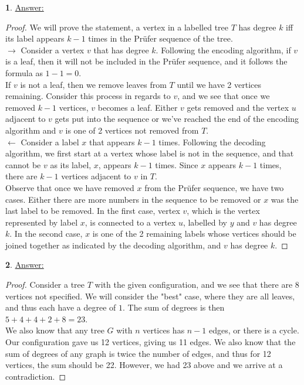 \documentclass[12pt,a4paper]{article}
\theoremstyle{definition}
\newtheorem{problem}{}
\begin{document}
\begin{problem} \underline{Answer:}
\begin{proof} 
We will prove the statement, a vertex in a labelled tree $T$ has degree $k$ iff its label appears $k - 1$ times in the Pr\"ufer sequence of the tree. \\

$\rightarrow$ Consider a vertex $v$ that has degree $k$. Following the encoding algorithm, if $v$ is a leaf, then it will not be included in the Pr\"ufer sequence, and it follows the formula as $1 - 1 = 0$. \\

If $v$ is not a leaf, then we remove leaves from $T$ until we have 2 vertices remaining. Consider this process in regards to $v$, and we see that once we removed $k - 1$ vertices, $v$ becomes a leaf. Either $v$ gets removed and the vertex $u$ adjacent to $v$ gets put into the sequence or we've reached the end of the encoding algorithm and $v$ is one of 2 vertices not removed from $T$.\\

$\leftarrow$ Consider a label $x$ that appears $k - 1$ times. Following the decoding algorithm, we first start at a vertex whose label is not in the sequence, and that cannot be $v$ as its label, $x$, appears $k - 1$ times. Since $x$ appears $k - 1$ times, there are $k - 1$ vertices adjacent to $v$ in $T$. \\

Observe that once we have removed $x$ from the Pr\"ufer sequence, we have two cases. Either there are more numbers in the sequence to be removed or $x$ was the last label to be removed. In the first case, vertex $v$, which is the vertex represented by label $x$, is connected to a vertex $u$, labelled by $y$ and $v$ has degree $k$. In the second case, $x$ is one of the 2 remaining labels whose vertices should be joined together as indicated by the decoding algorithm, and $v$ has degree $k$. 
\end{proof}
\end{problem}

\begin{problem} \underline{Answer:}
\begin{proof} 
Consider a tree $T$ with the given configuration, and we see that there are $8$ vertices not specified. We will consider the "best" case, where they are all leaves, and thus each have a degree of $1$. The sum of degrees is then $5 + 4 + 4 + 2 + 8 = 23$. \\

We also know that any tree $G$ with $n$ vertices has $n - 1$ edges, or there is a cycle. Our configuration gave us 12 vertices, giving us 11 edges. We also know that the sum of degrees of any graph is twice the number of edges, and thus for 12 vertices, the sum should be 22. However, we had 23 above and we arrive at a contradiction. 
\end{proof}
\end{problem}
\end{document}
